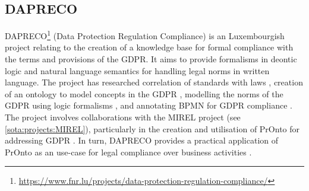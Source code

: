 \subsection{DAPRECO}\label{sota:projects:DAPRECO}
DAPRECO\footnote{\url{https://www.fnr.lu/projects/data-protection-regulation-compliance/}} (Data Protection Regulation Compliance) is an Luxembourgish project relating to the creation of a knowledge base for formal compliance with the terms and provisions of the GDPR. It aims to provide formalisms in deontic logic and natural language semantics for handling legal norms in written language. The project has researched correlation of standards with laws \cite{bartolini_towards_2016}, creation of an ontology to model concepts in the GDPR \cite{otake_using_2017}, modelling the norms of the GDPR using logic formalisms \cite{bartolini_legal_2018}, and annotating BPMN for GDPR compliance \cite{bartolini_enhancing_2019}.
The project involves collaborations with the MIREL project (see \autoref{sota:projects:MIREL}), particularly in the creation and utilisation of PrOnto for addressing GDPR \cite{monica_legal_2018,palmirani_pronto:_2018,palmirani_pronto:_2018-1,bartolini_enhancing_2019}. In turn, DAPRECO provides a practical application of PrOnto as an use-case for legal compliance over business activities \cite{bartolini_enhancing_2019,bartolini_agile_2019}.

